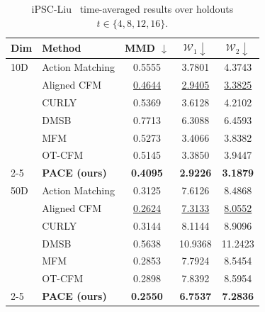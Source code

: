 \begin{table}[hbtp]
\centering
\scriptsize
\setlength{\tabcolsep}{3pt}
\caption{iPSC-Liu~\citep{liu2020reprogramming} time-averaged results over holdouts $t\in\{4,8,12,16\}$.}
\label{tab:ipsc_liu_dim10_50_mean}
\begin{tabular}{llccc}
\toprule
Dim & Method & MMD $\downarrow$ & $\mathcal{W}_1\downarrow$ & $\mathcal{W}_2\downarrow$ \\
\midrule
10D & Action Matching & 0.5555 & 3.7801 & 4.3743 \\
 & Aligned CFM & \underline{0.4644} & \underline{2.9405} & \underline{3.3825} \\
 & CURLY & 0.5369 & 3.6128 & 4.2102 \\
 & DMSB & 0.7713 & 6.3088 & 6.4593 \\
 & MFM & 0.5273 & 3.4066 & 3.8382 \\
 & OT-CFM & 0.5145 & 3.3850 & 3.9447 \\
\cmidrule(lr){2-5}
 & \textbf{PACE (ours)} & \textbf{0.4095} & \textbf{2.9226} & \textbf{3.1879} \\
\midrule
50D & Action Matching & 0.3125 & 7.6126 & 8.4868 \\
 & Aligned CFM & \underline{0.2624} & \underline{7.3133} & \underline{8.0552} \\
 & CURLY & 0.3144 & 8.1144 & 8.9096 \\
 & DMSB & 0.5638 & 10.9368 & 11.2423 \\
 & MFM & 0.2853 & 7.7924 & 8.5454 \\
 & OT-CFM & 0.2898 & 7.8392 & 8.5954 \\
\cmidrule(lr){2-5}
 & \textbf{PACE (ours)} & \textbf{0.2550} & \textbf{6.7537} & \textbf{7.2836} \\
\bottomrule
\end{tabular}
\end{table}
